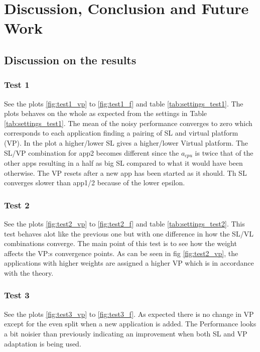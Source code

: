 \documentclass[nobiblatex]{LTHthesis}
\begin{document}
\chapter{Discussion, Conclusion and Future Work}
\label{chp:conclusion}

\section{Discussion on the results}
\subsection{Test 1}
See the plots \ref{fig:test1_vp} to \ref{fig:test1_f} and table \ref{tab:settings_test1}.
The plots behaves on the whole as expected from the settings in Table \ref{tab:settings_test1}.
The mean of the noisy performance converges to zero which corresponds to each application finding a pairing of SL and virtual platform (VP). In the plot a higher/lower SL gives a higher/lower Virtual platform. The SL/VP combination
for app2 becomes different since the $a_{cpu}$ is twice that of the other apps resulting in a half as big SL compared to what it would have been otherwise. The VP resets after a new app has been started as it should. Th SL converges slower than app1/2 because of the lower epsilon.

\subsection{Test 2} 
See the plots \ref{fig:test2_vp} to \ref{fig:test2_f} and table \ref{tab:settings_test2}.
This test behaves alot like the previous one but with one difference in how the SL/VL combinations converge. The main point of this test is to see how the weight affects the VP:s convergence points.
As can be seen in fig \ref{fig:test2_vp}, the applications with higher weights are assigned a higher VP which is in accordance with the theory.

\subsection{Test 3}
See the plots \ref{fig:test3_vp} to \ref{fig:test3_f}.
As expected there is no change in VP except for the even split when a new application is added. The Performance looks a bit noisier than previously indicating an improvement when both SL and VP adaptation is being used.
\end{document}
